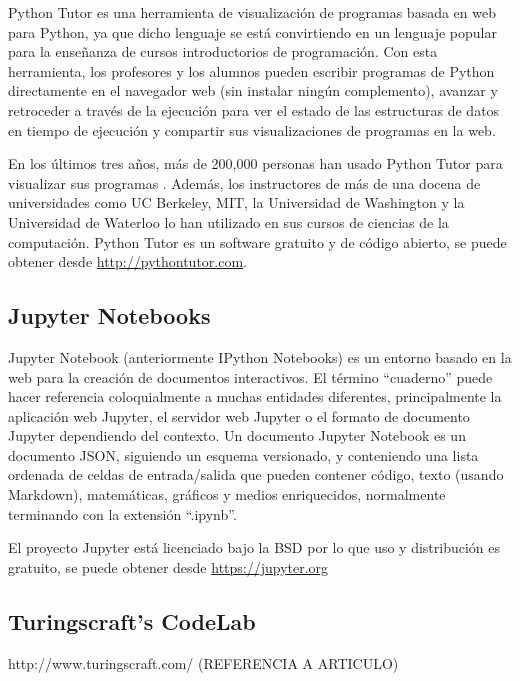 Python Tutor es una herramienta de visualización de programas basada en web para Python, ya que dicho lenguaje se está convirtiendo en un lenguaje popular para la enseñanza de cursos introductorios de programación. Con esta herramienta, los profesores y los alumnos pueden escribir programas de Python directamente en el navegador web (sin instalar ningún complemento), avanzar y retroceder a través de la ejecución para ver el estado de las estructuras de datos en tiempo de ejecución y compartir sus visualizaciones de programas en la web.

En los últimos tres años, más de 200,000 personas han usado Python Tutor para visualizar sus programas \cite{GuoSIGCSE2013}. Además, los instructores de más de una docena de universidades como UC Berkeley, MIT, la Universidad de Washington y la Universidad de Waterloo lo han utilizado en sus cursos de ciencias de la computación. Python Tutor es un software gratuito y de código abierto, se puede obtener desde \url{http://pythontutor.com}.


\subsection {Jupyter Notebooks}

Jupyter Notebook (anteriormente IPython Notebooks) es un entorno basado en la web para la creación de documentos interactivos. El término ``cuaderno'' puede hacer referencia coloquialmente a muchas entidades diferentes, principalmente la aplicación web Jupyter, el servidor web Jupyter o el formato de documento Jupyter dependiendo del contexto. Un documento Jupyter Notebook es un documento JSON, siguiendo un esquema versionado, y conteniendo una lista ordenada de celdas de entrada/salida que pueden contener código, texto (usando Markdown), matemáticas, gráficos y medios enriquecidos, normalmente terminando con la extensión ``.ipynb''.

El proyecto Jupyter está licenciado bajo la BSD por lo que uso y distribución es gratuito, se puede obtener desde \url{https://jupyter.org}

\subsection {Turingscraft's CodeLab}

http://www.turingscraft.com/
(REFERENCIA A ARTICULO)



